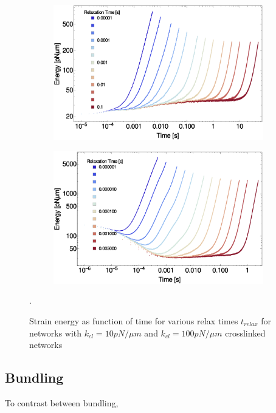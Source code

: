 \documentclass[12pt]{article} \usepackage{times} \usepackage{graphicx}
\begin{document}
  \label{strain_supp} \begin{figure}[H] \begin{subfigure}{0.35\textwidth}
      \centering
      \includegraphics[width=\textwidth]{figs/elasticity/eng_vs_t_k10.eps}
      \caption{\label{fig:tRelax10}} \end{subfigure}
    \begin{subfigure}{0.35\textwidth} \centering
      \includegraphics[width=\textwidth]{figs/elasticity/eng_vs_t_k100.eps}
      \caption{\label{fig:tRelax100}} \end{subfigure} \label{fig:tRelax}
    \caption{Strain energy as function of time for various relax times
      $t_{relax}$ for networks with  $k_{cl}=10pN/\mu m$
      and $k_{cl}=100pN/\mu m$  crosslinked networks}.
    \end{figure} \subsection{Bundling} To contrast between bundling,
\end{document}
